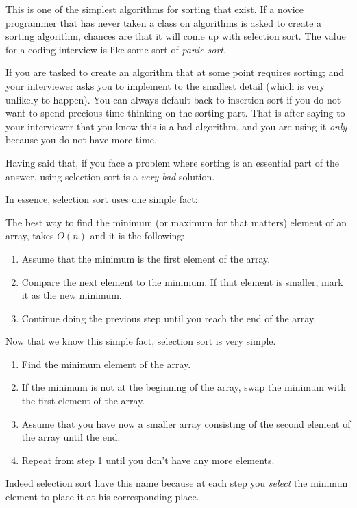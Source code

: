 This is one of the simplest algorithms for sorting that exist.
If a novice programmer that has never taken a class on algorithms is asked to create a sorting algorithm, chances are that it will come up with selection sort.
The value for a coding interview is like some sort of \emph{panic sort}.

If you are tasked to create an algorithm that at some point requires sorting; and your interviewer asks you to implement to the smallest detail (which is very unlikely to happen).
You can always default back to insertion sort if you do not want to spend precious time thinking on the sorting part.
That is after saying to your interviewer that you know this is a bad algorithm, and you are using it \emph{only} because you do not have more time.

Having said that, if you face a problem where sorting is an essential part of the answer, using selection sort is a \emph{very bad} solution.

In essence, selection sort uses one simple fact:

The best way to find the minimum (or maximum for that matters) element of an array, takes $O(n)$ and it is the following:
\begin{enumerate}
 \item Assume that the minimum is the first element of the array.
 \item Compare the next element to the minimum. If that element is smaller, mark it as the new minimum.
 \item Continue doing the previous step until you reach the end of the array.
\end{enumerate}

Now that we know this simple fact, selection sort is very simple.

\begin{enumerate}
 \item Find the minimum element of the array.
 \item If the minimum is not at the beginning of the array, swap the minimum with the first element of the array.
 \item Assume that you have now a smaller array consisting of the second element of the array until the end.
 \item Repeat from step 1 until you don't have any more elements.
\end{enumerate}

Indeed selection sort have this name because at each step you \emph{select} the minimun element to place it at his corresponding place.

